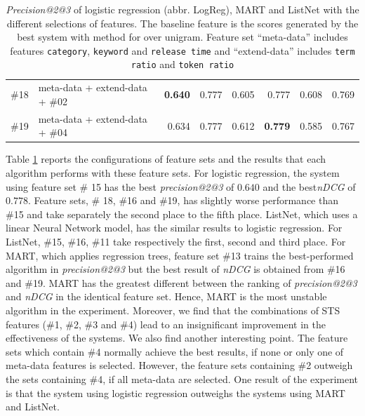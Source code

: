 \begin{table}[!hbt]
{\begin{tabularx}{1\textwidth}{lX|rr|rr|rr}
\#18 & meta-data + extend-data + \#02 & \textbf{0.640} &  0.777 & 0.605 & 0.777 & 0.608 & 0.769\\
\#19 & meta-data + extend-data + \#04 & 0.634 & 0.777 & 0.612 & \textbf{0.779} & 0.585 & 0.767 \\ \hline
\end{tabularx}
}
\caption[\textit{Precision@2@3} and \textit{nDCG} of logistic regression, MART and ListNet with the different selections of features in 5-fold cross validation]{\textit{Precision@2@3} of logistic regression (abbr. LogReg), MART and ListNet with the different selections of features. The baseline feature is the scores generated by the best system with method \tfidf{} for \icontent{} over unigram. Feature set ``meta-data'' includes features \texttt{category}, \texttt{keyword} and \texttt{release time} and ``extend-data'' includes \texttt{term ratio} and \texttt{token ratio}}
\label{tab:supervised}
\end{table}

\clearpage

Table \ref{tab:supervised} reports the configurations of feature sets and the results that each algorithm performs with these feature sets. For logistic regression, the system using feature set \# 15 has the best \textit{precision@2@3} of $0.640$ and the best\textit{nDCG} of $0.778$. Feature sets, \# 18, \#16 and \#19, has slightly worse performance than \#15 and take separately the second place to the fifth place. ListNet, which uses a linear Neural Network model, has the similar results to logistic regression. For ListNet, \#15, \#16, \#11 take respectively the first, second and third place. For MART, which applies regression trees, feature set \#13 trains the best-performed algorithm in \textit{precision@2@3} but the best result of \textit{nDCG} is obtained from \#16 and \#19. MART has the greatest different between the ranking of \textit{precision@2@3} and \textit{nDCG} in the identical feature set. Hence, MART is the most unstable algorithm in the experiment. Moreover, we find that the combinations of STS features (\#1, \#2, \#3 and \#4) lead to an insignificant improvement in the effectiveness of the systems. We also find another interesting point. The feature sets which contain \#4 normally achieve the best results, if none or only one of meta-data features is selected. However, the feature sets containing \#2 outweigh the sets containing \#4, if all meta-data are selected. One result of the experiment is that the system using logistic regression outweighs the systems using MART and ListNet.

